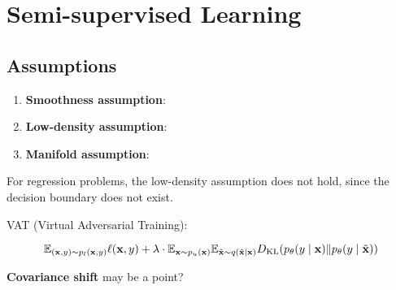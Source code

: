 \chapter{Semi-supervised Learning}

\section{Assumptions}

\begin{enumerate}
	\item \textbf{Smoothness assumption}:
	\item \textbf{Low-density assumption}:
	\item \textbf{Manifold assumption}:
\end{enumerate}

\begin{remark}
	For regression problems, the low-density assumption does not hold, since the decision boundary does not exist.
\end{remark}

VAT (Virtual Adversarial Training):

\begin{equation*}
	{\mathbb E}_{({\bf x},y)\sim p_{l}({\bf x},y)}\ell({\bf x},y)+\lambda\cdot{\mathbb E}_{{\bf x}\sim p_{u}({\bf x})}{\mathbb E}_{\tilde{{\bf x}}\sim q(\tilde{{\bf x}}\mid{\bf x})}D_{\text{KL}}(p_{\theta}(y\mid{\bf x})\|p_{\theta}(y\mid\tilde{{\bf x}}))
\end{equation*}

\textbf{Covariance shift} may be a point?
